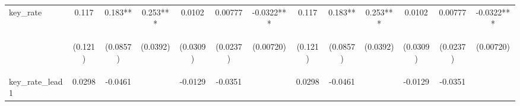 \documentclass[]{article}
\begin{document}
\begin{center}
\begin{tabular}{lcccccccccccc}
key\_rate & 0.117 & 0.183** & 0.253*** & 0.0102 & 0.00777 & -0.0322*** & 0.117 & 0.183** & 0.253*** & 0.0102 & 0.00777 & -0.0322*** \\
\vspace{4pt} & \begin{footnotesize}(0.121)\end{footnotesize} & \begin{footnotesize}(0.0857)\end{footnotesize} & \begin{footnotesize}(0.0392)\end{footnotesize} & \begin{footnotesize}(0.0309)\end{footnotesize} & \begin{footnotesize}(0.0237)\end{footnotesize} & \begin{footnotesize}(0.00720)\end{footnotesize} & \begin{footnotesize}(0.121)\end{footnotesize} & \begin{footnotesize}(0.0857)\end{footnotesize} & \begin{footnotesize}(0.0392)\end{footnotesize} & \begin{footnotesize}(0.0309)\end{footnotesize} & \begin{footnotesize}(0.0237)\end{footnotesize} & \begin{footnotesize}(0.00720)\end{footnotesize} \\
key\_rate\_lead1 & 0.0298 & -0.0461 &  & -0.0129 & -0.0351 &  & 0.0298 & -0.0461 &  & -0.0129 & -0.0351 &  \\

\end{tabular}
\end{center}
\end{document}
